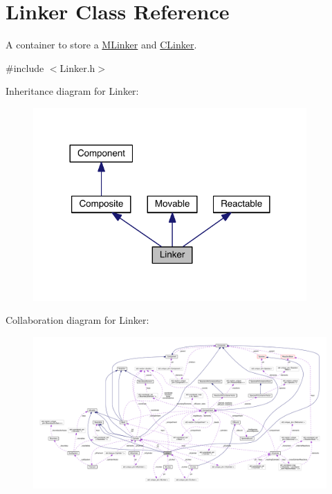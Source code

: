 \hypertarget{classLinker}{\section{Linker Class Reference}
\label{classLinker}
}


A container to store a \hyperlink{classMLinker}{M\+Linker} and \hyperlink{classCLinker}{C\+Linker}.  




{\ttfamily \#include $<$Linker.\+h$>$}



Inheritance diagram for Linker\+:\nopagebreak
\begin{figure}[H]
\begin{center}
\leavevmode
\includegraphics[width=296pt]{classLinker__inherit__graph}
\end{center}
\end{figure}


Collaboration diagram for Linker\+:
\nopagebreak
\begin{figure}[H]
\begin{center}
\leavevmode
\includegraphics[width=350pt]{classLinker__coll__graph}
\end{center}
\end{figure}
